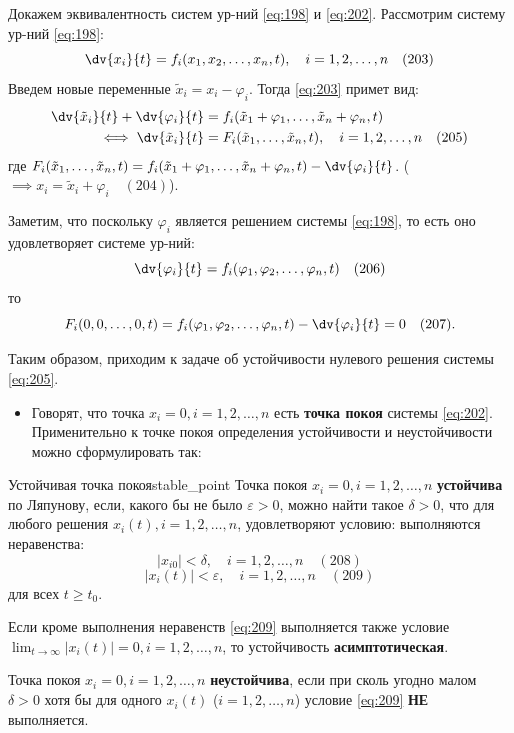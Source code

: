 \begin{proofbox}
	Докажем эквивалентность систем ур-ний \eqref{eq:198} и \eqref{eq:202}. Рассмотрим систему ур-ний \eqref{eq:198}:
	\begin{equation} \label{eq:203}
		\dv{x_i}{t} = f_i(x_1, x_2, \dots, x_n, t), \quad i=1,2,\dots,n \quad (203)
	\end{equation}
	Введем новые переменные $\tilde{x}_i = x_i - \varphi_i$. Тогда \eqref{eq:203} примет вид:
	\begin{align}
		\dv{\tilde{x}_i}{t} + \dv{\varphi_i}{t} &= f_i(\tilde{x}_1 + \varphi_1, \dots, \tilde{x}_n + \varphi_n, t) \notag \\
		\iff \dv{\tilde{x}_i}{t} &= F_i(\tilde{x}_1, \dots, \tilde{x}_n, t), \quad i=1,2,\dots,n \quad (205) \label{eq:205}
	\end{align}
	где $F_i(\tilde{x}_1, \dots, \tilde{x}_n, t) = f_i(\tilde{x}_1+\varphi_1, \dots, \tilde{x}_n+\varphi_n, t) - \dv{\varphi_i}{t}$. \quad ($\implies x_i = \tilde{x}_i + \varphi_i \quad (204)$).
	
	Заметим, что поскольку $\varphi_i$ является решением системы \eqref{eq:198}, то есть оно удовлетворяет системе ур-ний:
	$$\dv{\varphi_i}{t} = f_i(\varphi_1, \varphi_2, \dots, \varphi_n, t) \quad (206)$$
	то
	$$F_i(0, 0, \dots, 0, t) = f_i(\varphi_1, \varphi_2, \dots, \varphi_n, t) - \dv{\varphi_i}{t} = 0 \quad (207).$$
	
	Таким образом, приходим к задаче об устойчивости нулевого решения системы \eqref{eq:205}.
\end{proofbox}

\begin{itemize}
	\item Говорят, что точка $x_i=0, i=1,2,\dots,n$ есть \textbf{точка покоя} системы \eqref{eq:202}. Применительно к точке покоя определения устойчивости и неустойчивости можно сформулировать так:
\end{itemize}

\begin{definition}{Устойчивая точка покоя}{stable_point}
	Точка покоя $x_i=0, i=1,2,\dots,n$ \textbf{устойчива} по Ляпунову, если, какого бы не было $\varepsilon > 0$, можно найти такое $\delta > 0$, что для любого решения $x_i(t), i=1,2,\dots,n$, удовлетворяют условию: выполняются неравенства:
	\begin{equation} \label{eq:208}
		|x_{i0}| < \delta, \quad i=1,2,\dots,n \quad (208)
	\end{equation}
	\begin{equation} \label{eq:209}
		|x_i(t)| < \varepsilon, \quad i=1,2,\dots,n \quad (209)
	\end{equation}
	для всех $t \ge t_0$.
\end{definition}

Если кроме выполнения неравенств \eqref{eq:209} выполняется также условие $\lim_{t \to \infty} |x_i(t)| = 0, i=1,2,\dots,n$, то устойчивость \textbf{асимптотическая}.

Точка покоя $x_i=0, i=1,2,\dots,n$ \textbf{неустойчива}, если при сколь угодно малом $\delta > 0$ хотя бы для одного $x_i(t)$ ($i=1,2,\dots,n$) условие \eqref{eq:209} \textbf{НЕ} выполняется.